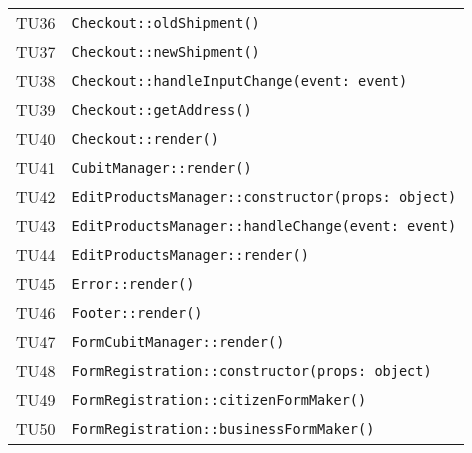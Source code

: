 \begin{longtable}{ >{\centering}p{} >{}p{}}
			\hypertarget{TU36}{TU36} & 
			\texttt{Checkout::oldShipment()}\\
			
			\hypertarget{TU37}{TU37} & 
			\texttt{Checkout::newShipment()}\\
			
			\hypertarget{TU38}{TU38} & 
			\texttt{Checkout::handleInputChange(event: event)}\\
			
			\hypertarget{TU39}{TU39} & 
			\texttt{Checkout::getAddress()}\\
			
			\hypertarget{TU40}{TU40} & 
			\texttt{Checkout::render()}\\
			
			\hypertarget{TU41}{TU41} & 
			\texttt{CubitManager::render()}\\
			
			\hypertarget{TU42}{TU42} & 
			\texttt{EditProductsManager::constructor(props: object)}\\
			
			\hypertarget{TU43}{TU43} & 
			\texttt{EditProductsManager::handleChange(event: event)}\\
			
			\hypertarget{TU44}{TU44} & 
			\texttt{EditProductsManager::render()}\\
			
			\hypertarget{TU45}{TU45} & 
			\texttt{Error::render()}\\
			
			\hypertarget{TU46}{TU46} & 
			\texttt{Footer::render()}\\
			
			\hypertarget{TU47}{TU47} & 
			\texttt{FormCubitManager::render()}\\
			
			\hypertarget{TU48}{TU48} & 
			\texttt{FormRegistration::constructor(props: object)}\\
			
			\hypertarget{TU49}{TU49} & 
			\texttt{FormRegistration::citizenFormMaker()}\\
			
			\hypertarget{TU50}{TU50} & 
			\texttt{FormRegistration::businessFormMaker()}\\
			
		\end{longtable}
